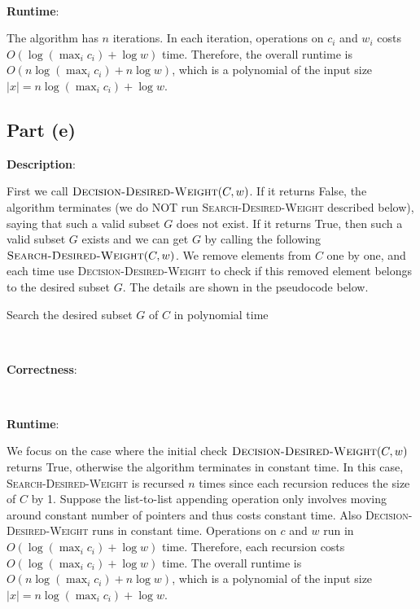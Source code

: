 \documentclass{article}
\begin{document}
~

\noindent\textbf{Runtime}:

The algorithm has $n$ iterations. In each iteration, operations on $c_i$ and $w_i$ costs $O(\log(\max_ic_i)+\log w)$ time. Therefore, the overall runtime is $O(n\log(\max_ic_i)+n\log w)$, which is a polynomial of the input size $|x|=n\log(\max_ic_i)+\log w$.

\subsection{Part (e)}
\noindent\textbf{Description}:

First we call $\textsc{Decision-Desired-Weight}(C,w)$. If it returns False, the algorithm terminates (we do NOT run \textsc{Search-Desired-Weight} described below), saying that such a valid subset $G$ does not exist. If it returns True, then such a valid subset $G$ exists and we can get $G$ by calling the following $\textsc{Search-Desired-Weight}(C,w)$. We remove elements from $C$ one by one, and each time use \textsc{Decision-Desired-Weight} to check if this removed element belongs to the desired subset $G$. The details are shown in the pseudocode below.
\begin{algorithm}
\caption{Search the desired subset $G$ of $C$ in polynomial time}
\begin{algorithmic}[1]
\State{}
	\Else{}
	\EndIf
\EndIf
\State{}
\EndProcedure
\end{algorithmic}
\end{algorithm}

~

\noindent\textbf{Correctness}:

~

\noindent\textbf{Runtime}:

We focus on the case where the initial check $\textsc{Decision-Desired-Weight}(C,w)$ returns True, otherwise the algorithm terminates in constant time. In this case, \textsc{Search-Desired-Weight} is recursed $n$ times since each recursion reduces the size of $C$ by 1. Suppose the list-to-list appending operation only involves moving around constant number of pointers and thus costs constant time. Also \textsc{Decision-Desired-Weight} runs in constant time. Operations on $c$ and $w$ run in $O(\log(\max_ic_i)+\log w)$ time. Therefore, each recursion costs $O(\log(\max_ic_i)+\log w)$ time. The overall runtime is $O(n\log(\max_ic_i)+n\log w)$, which is a polynomial of the input size $|x|=n\log(\max_ic_i)+\log w$.
\end{document}
